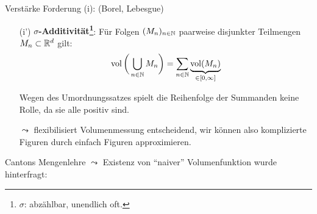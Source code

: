 Verstärke Forderung (i): (Borel, Lebesgue)
\begin{enumerate}
\item[(i')]\textbf{$\sigma$-Additivität\footnote{$\sigma$: abzählbar, unendlich oft.}}: Für Folgen $(M_n)_{n\in \mathbb{N}}$ paarweise disjunkter Teilmengen $M_n \subset \mathbb{R}^d$ gilt:
\begin{equation*}
\operatorname{vol}\bigg( \bigcup_{n\in \mathbb{N}} M_n \bigg) = \sum_{n\in \mathbb{N}} \underbrace{\operatorname{vol} (M_n)}_{\in [0,\infty]} 
\end{equation*}
\begin{remark}
Wegen des Umordnungssatzes spielt die Reihenfolge der Summanden keine Rolle, da sie alle positiv sind.
\end{remark}
$\leadsto$ flexibilisiert Volumenmessung entscheidend, wir können also komplizierte Figuren durch einfach Figuren approximieren.
\end{enumerate}
Cantons Mengenlehre $\leadsto$ Existenz von ``naiver'' Volumenfunktion wurde hinterfragt: %
